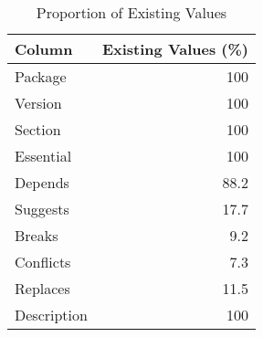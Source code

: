 \begingroup
    \renewcommand{\arraystretch}{2} %
    \begin{table}[!hb]
        \centering
        \begin{tabular}{lr}
            \textbf{Column}      &   \textbf{Existing Values (\%)} \\
            \hline 
             Package     &              100   \\
             Version     &              100   \\
             Section     &              100   \\
             Essential   &              100   \\
             Depends     &               88.2 \\
             Suggests    &               17.7 \\
             Breaks      &                9.2 \\
             Conflicts   &                7.3 \\
             Replaces    &               11.5 \\
             Description &              100   \\
        \end{tabular}
         \caption{Proportion of Existing Values}
         \label{tab:existing-values}
    \end{table}
\endgroup
